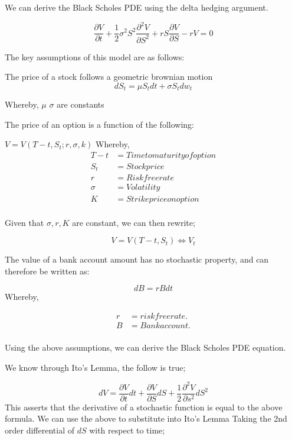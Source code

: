 \documentclass[12pt]{article}
\begin{document}
	We can derive the Black Scholes PDE using the delta hedging argument.
	
	\begin{equation}
	\frac{\partial V}{\partial t} + \frac{1}{2}\sigma^2S^2 \frac{\partial^2 V}{\partial S^2}+rS\frac{\partial V}{\partial S} - rV = 0
	\end{equation}
	
	The key assumptions of this model are as follows:
	
	The price of a stock follows a geometric brownian motion
	\begin{equation}
	dS_{t}= \mu S_{t} dt + \sigma S_{t} dw_{t}
	\end{equation}
	
	Whereby, $\mu$ $\sigma$ are constants
	
	The price of an option is a function of the following:
	
	
	$V = V(T-t, S_{t}; r, \sigma, k)$
	Whereby,
	\begin{align*}
	T - t &= Time to maturity of option \\
	S_{t} &= Stock price \\
	r &= Risk free rate \\
	\sigma &= Volatility \\
	K &= Strike price on option \\
	\end{align*}
	
	Given that $\sigma, r, K$ are constant, we can then rewrite;
	
	\begin{equation}
	V = V(T-t,S_{t}) \iff V_{t}
	\end{equation}
	
	The value of a bank account amount has no stochastic property, and can therefore be written as:
	
	\begin{equation}
	dB = rBdt
	\end{equation}
	Whereby,
	
	\begin{align*}
	r &= risk free rate. \\
	B &= Bank account. \\
	\end{align*}
	
	Using the above assumptions, we can derive the Black Scholes PDE equation.
	
	We know through Ito's Lemma, the follow is true;
	
	\begin{equation}
	dV = \frac{\partial V}{\partial t}dt + \frac{\partial V}{\partial S}dS + \frac{1}{2}\frac{\partial^2 V}{\partial s^2}dS^2
	\end{equation}
	This asserts that the derivative of a stochastic function is equal to the above formula.
	We can use the above to substitute into Ito's Lemma
	Taking the 2nd order differential of $dS$ with respect to time;
	
\end{document}
